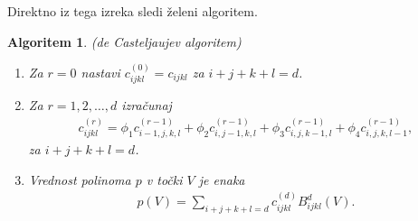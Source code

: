 \documentclass[11pt,a4paper]{article}
\newtheorem{algorithm}{Algoritem}
\begin{document}
Direktno iz tega izreka sledi želeni algoritem.

\begin{algorithm}{(de Casteljaujev algoritem)}
    \begin{enumerate}
        \item Za $r = 0$ nastavi $c_{ijkl}^{(0)} = c_{ijkl}$ za $i+j+k+l = d$.
        \item Za $r = 1, 2, \ldots, d$ izračunaj
        \begin{align*}
            c_{ijkl}^{(r)} = \phi_1 c_{i-1,j,k,l}^{(r-1)} + \phi_2 c_{i,j-1,k,l}^{(r-1)} + \phi_3 c_{i,j,k-1,l}^{(r-1)} + \phi_4 c_{i,j,k,l-1}^{(r-1)},
        \end{align*}
        za $i+j+k+l = d$.
        \item Vrednost polinoma $p$ v točki $V$ je enaka
        \begin{align*}
            p(V) = \sum_{i+j+k+l = d} c_{ijkl}^{(d)} B_{ijkl}^d(V).
        \end{align*}
    \end{enumerate}
\end{algorithm}
\end{document}
